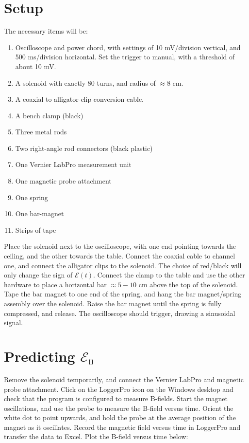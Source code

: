 \documentclass[12pt]{article}
\begin{document}
\section{Setup}

The necessary items will be:

\begin{enumerate}
\item Oscilloscope and power chord, with settings of 10 mV/division vertical, and 500 ms/division horizontal.  Set the trigger to manual, with a threshold of about 10 mV.
\item A solenoid with exactly 80 turns, and radius of $\approx 8$ cm.
\item A coaxial to alligator-clip conversion cable.
\item A bench clamp (black)
\item Three metal rods
\item Two right-angle rod connectors (black plastic)
\item One Vernier LabPro measurement unit
\item One magnetic probe attachment
\item One spring
\item One bar-magnet
\item Strips of tape
\end{enumerate}

Place the solenoid next to the oscilloscope, with one end pointing towards the ceiling, and the other towards the table.  Connect the coaxial cable to channel one, and connect the alligator clips to the solenoid.  The choice of red/black will only change the sign of $\mathcal{E}(t)$.  Connect the clamp to the table and use the other hardware to place a horizontal bar $\approx 5-10$ cm above the top of the solenoid.  Tape the bar magnet to one end of the spring, and hang the bar magnet/spring assembly over the solenoid.  Raise the bar magnet until the spring is fully compressed, and release.  The oscilloscope should trigger, drawing a sinusoidal signal.

\section{Predicting $\mathcal{E}_0$}

Remove the solenoid temporarily, and connect the Vernier LabPro and magnetic probe attachment.  Click on the LoggerPro icon on the Windows desktop and check that the program is configured to measure B-fields. Start the magnet oscillations, and use the probe to measure the B-field versus time.  Orient the white dot to point upwards, and hold the probe at the average position of the magnet as it oscillates.  Record the magnetic field versus time in LoggerPro and transfer the data to Excel.  Plot the B-field versus time below: \\ \vspace{5cm}
\end{document}
